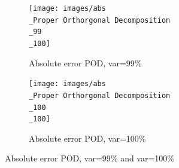 \begin{figure}[H]
\begin{subfigure}{.5\textwidth}
\texttt{[image: images/abs\\\_Proper Orthorgonal Decomposition\\\_99\\\_100]}
\caption{Absolute error POD, var=99\%}
\label{FIG-ABS-POD100}
\end{subfigure}
\begin{subfigure}{.5\textwidth}
\centering
\texttt{[image: images/abs\\\_Proper Orthorgonal Decomposition\\\_100\\\_100]}
\caption{Absolute error POD, var=100\%}
\label{FIG-ABS-POD100}
\end{subfigure}
\caption{Absolute error POD, var=99\% and var=100\%}
\label{FIG-ABS_POD3}
\end{figure}
